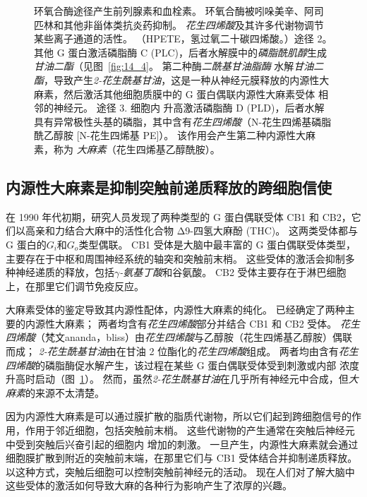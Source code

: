\begin{figure}[htbp]
{		环氧合酶途径产生前列腺素和血栓素。
		环氧合酶被吲哚美辛、阿司匹林和其他非甾体类抗炎药抑制。
		\textit{花生四烯酸}及其许多代谢物调节某些离子通道的活性。
		（HPETE，氢过氧二十碳四烯酸。）途径 2。
		其他 G 蛋白激活磷脂酶 C (PLC)，后者水解膜中的\textit{磷脂酰肌醇}生成\textit{甘油二酯}（见图~\ref{fig:14_4}。
		第二种酶\textit{二酰基甘油脂酶} 水解\textit{甘油二酯}，导致产生\textit{2-花生酰基甘油}，这是一种从神经元膜释放的内源性大麻素，然后激活其他细胞质膜中的 G 蛋白偶联内源性大麻素受体 相邻的神经元。
		途径 3. 细胞内  升高激活磷脂酶 D (PLD)，后者水解具有异常极性头基的磷脂，其中含有\textit{花生四烯酸}（N-花生四烯基磷脂酰乙醇胺 [N-花生四烯基 PE]）。
		该作用会产生第二种内源性大麻素，称为 \textit{大麻素}（花生四烯基乙醇酰胺）。}
	\label{fig:14_6}
\end{figure}



\subsection{内源性大麻素是抑制突触前递质释放的跨细胞信使}

在 1990 年代初期，研究人员发现了两种类型的 G 蛋白偶联受体 CB1 和 CB2，它们以高亲和力结合大麻中的活性化合物 Δ9-四氢大麻酚 (THC)。
这两类受体都与 G 蛋白的\textit{$G_i$}和$G_o$类型偶联。
CB1 受体是大脑中最丰富的 G 蛋白偶联受体类型，主要存在于中枢和周围神经系统的轴突和突触前末梢。
这些受体的激活会抑制多种神经递质的释放，包括\textit{$\gamma$-氨基丁酸}和谷氨酸。
CB2 受体主要存在于淋巴细胞上，在那里它们调节免疫反应。


大麻素受体的鉴定导致其内源性配体，内源性大麻素的纯化。
已经确定了两种主要的内源性大麻素；
两者均含有\textit{花生四烯酸}部分并结合 CB1 和 CB2 受体。 
\textit{花生四烯酸}（梵文ananda，bliss）由\textit{花生四烯酸}与乙醇胺（花生四烯基乙醇胺）偶联而成；
\textit{2-花生酰基甘油}由在甘油 2 位酯化的\textit{花生四烯酸}组成。
两者均由含有\textit{花生四烯酸}的磷脂酶促水解产生，该过程在某些 G 蛋白偶联受体受到刺激或内部  浓度升高时启动（图~\ref{fig:14_6}）。
然而，虽然\textit{2-花生酰基甘油}在几乎所有神经元中合成，但\textit{大麻素}的来源不太清楚。


因为内源性大麻素是可以通过膜扩散的脂质代谢物，所以它们起到跨细胞信号的作用，作用于邻近细胞，包括突触前末梢。
这些代谢物的产生通常在突触后神经元中受到突触后兴奋引起的细胞内  增加的刺激。
一旦产生，内源性大麻素就会通过细胞膜扩散到附近的突触前末端，在那里它们与 CB1 受体结合并抑制递质释放。
以这种方式，突触后细胞可以控制突触前神经元的活动。 
现在人们对了解大脑中这些受体的激活如何导致大麻的各种行为影响产生了浓厚的兴趣。



